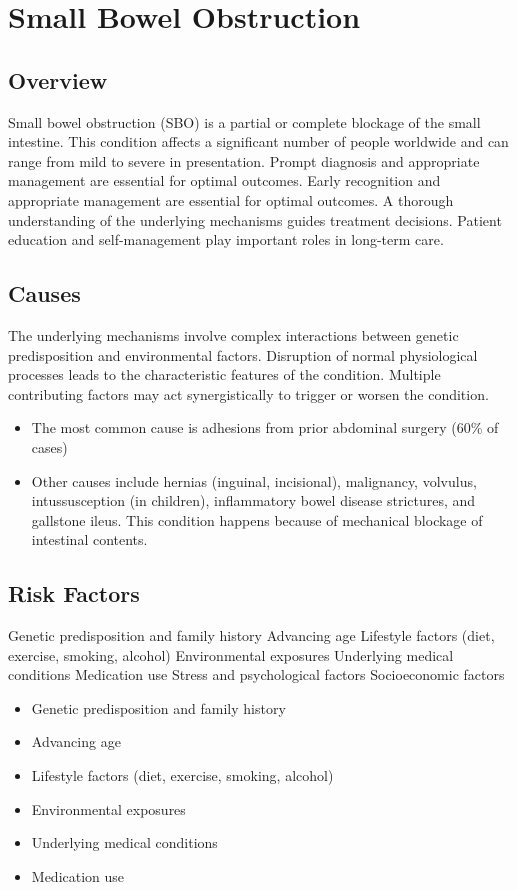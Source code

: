 \chapter{Small Bowel Obstruction}
\label{sec:Small Bowel Obstruction}

\section{Overview}
Small bowel obstruction (SBO) is a partial or complete blockage of the small intestine. This condition affects a significant number of people worldwide and can range from mild to severe in presentation. Prompt diagnosis and appropriate management are essential for optimal outcomes. Early recognition and appropriate management are essential for optimal outcomes. A thorough understanding of the underlying mechanisms guides treatment decisions. Patient education and self-management play important roles in long-term care.
\section{Causes}
The underlying mechanisms involve complex interactions between genetic predisposition and environmental factors. Disruption of normal physiological processes leads to the characteristic features of the condition. Multiple contributing factors may act synergistically to trigger or worsen the condition.

\begin{itemize}[noitemsep]
  \item The most common cause is adhesions from prior abdominal surgery (60\% of cases)
  \item Other causes include hernias (inguinal, incisional), malignancy, volvulus, intussusception (in children), inflammatory bowel disease strictures, and gallstone ileus. This condition happens because of mechanical blockage of intestinal contents.
\end{itemize}
\section{Risk Factors}
Genetic predisposition and family history Advancing age Lifestyle factors (diet, exercise, smoking, alcohol) Environmental exposures Underlying medical conditions Medication use Stress and psychological factors Socioeconomic factors

\begin{itemize}[noitemsep]
  \item Genetic predisposition and family history
  \item Advancing age
  \item Lifestyle factors (diet, exercise, smoking, alcohol)
  \item Environmental exposures
  \item Underlying medical conditions
  \item Medication use
\end{itemize}
